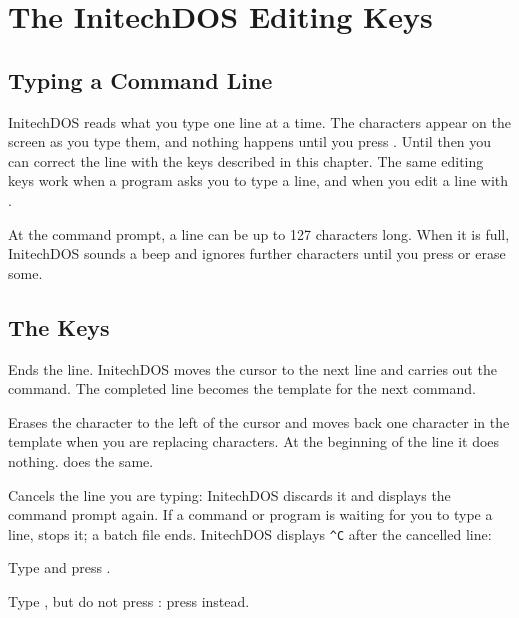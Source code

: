 \chapter{The InitechDOS Editing Keys}

\section{Typing a Command Line}
InitechDOS reads what you type one line at a time. The characters appear on
 the screen as you type them, and nothing happens until you press
. Until then you can correct the line with the keys described
in this chapter. The same editing keys work when a program asks you to
type a line, and when you edit a line with .

At the command prompt, a line can be up to 127 characters long. When it is
full, InitechDOS sounds a beep and ignores further characters until you
press  or erase some.

\section{The Keys}
Ends the line. InitechDOS moves the cursor to the next
line and carries out the command. The completed line becomes the template
for the next command.

Erases the character to the left of the cursor and
moves back one character in the template when you are replacing characters.
At the beginning of the line it does nothing.  does the same.

Cancels the line you are typing: InitechDOS discards it
and displays the command prompt again. If a command or program is waiting
for you to type a line,  stops it; a batch file ends.
InitechDOS displays \texttt{\textasciicircum C} after the cancelled line:
\begin{Steps}
\item Type  and press .
\item Type , but do not press : press 
  instead.
\end{Steps}

